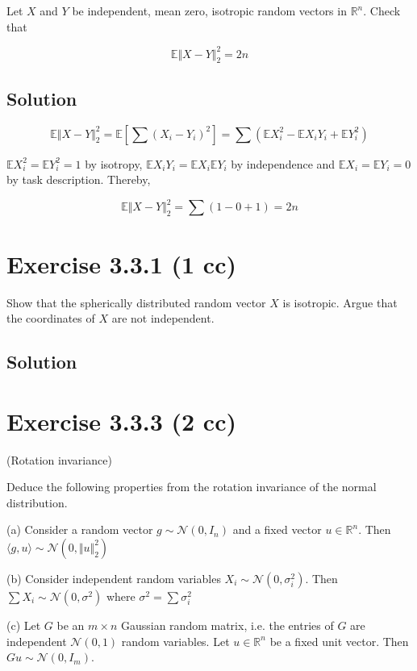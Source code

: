 \documentclass{article}
\begin{document}
Let $X$ and $Y$ be independent, mean zero, isotropic random vectors in $\mathbb R^n$. Check that

$$\mathbb E \Vert X - Y \Vert^2_2 = 2n$$

\subsection{Solution}

$$\mathbb E \Vert X - Y \Vert^2_2 = \mathbb E \left[\sum (X_i - Y_i)^2\right] = \sum (\mathbb E X_i^2 - \mathbb E X_iY_i + \mathbb E Y_i^2)$$

$\mathbb E X_i^2 = \mathbb E Y_i^2 = 1$ by isotropy, $\mathbb E X_i Y_i = \mathbb E X_i\mathbb E Y_i$ by independence and $\mathbb EX_i = \mathbb E Y_i = 0$ by task description. Thereby,

$$\mathbb E \Vert X - Y \Vert^2_2 = \sum (1 - 0 + 1) = 2n$$

\section{ Exercise 3.3.1 (1 cc) }

Show that the spherically distributed random vector $X$ is
isotropic. Argue that the coordinates of $X$ are not independent.

\subsection{Solution}

\section{ Exercise 3.3.3 (2 cc) }

(Rotation invariance)

Deduce the following properties from the rotation invariance of the normal distribution.

(a) Consider a random vector $g \sim \mathcal N(0,I_n)$ and a fixed vector $u \in \mathbb R^n$. Then $ \langle g, u \rangle \sim \mathcal N(0, \Vert u \Vert^2_2)$

(b) Consider independent random variables $X_i \sim \mathcal N(0,\sigma_i^2)$. Then $\sum X_i \sim \mathcal N(0, \sigma^2)$ where $\sigma^2 = \sum \sigma_i^2$

(c) Let $G$ be an $m \times n$ Gaussian random matrix, i.e. the entries of $G$ are independent $\mathcal N(0,1)$ random variables. Let $u \in \mathbb R^n$ be a fixed unit vector. Then $Gu \sim \mathcal N(0, I_m)$.
\end{document}
